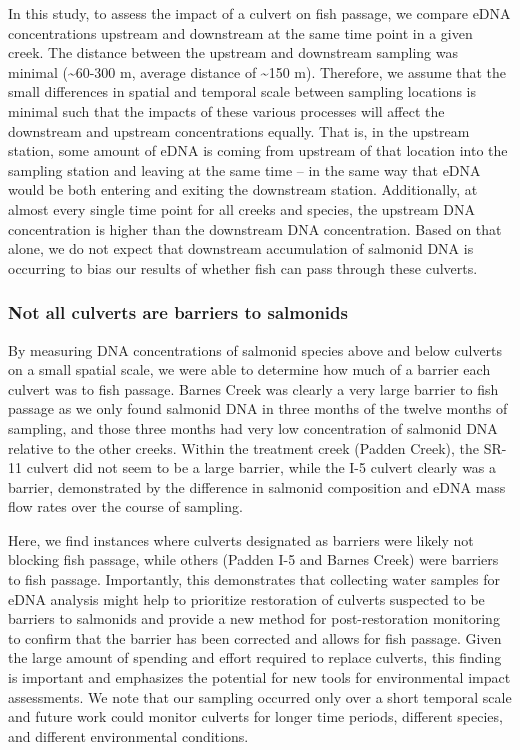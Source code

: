 \documentclass[
]{article}
\begin{document}
In this study, to assess the impact of a culvert on fish passage, we
compare eDNA concentrations upstream and downstream at the same time
point in a given creek. The distance between the upstream and downstream
sampling was minimal (\textasciitilde60-300 m, average distance of
\textasciitilde150 m). Therefore, we assume that the small differences
in spatial and temporal scale between sampling locations is minimal such
that the impacts of these various processes will affect the downstream
and upstream concentrations equally. That is, in the upstream station,
some amount of eDNA is coming from upstream of that location into the
sampling station and leaving at the same time -- in the same way that
eDNA would be both entering and exiting the downstream station.
Additionally, at almost every single time point for all creeks and
species, the upstream DNA concentration is higher than the downstream
DNA concentration. Based on that alone, we do not expect that downstream
accumulation of salmonid DNA is occurring to bias our results of whether
fish can pass through these culverts.

\hypertarget{not-all-culverts-are-barriers-to-salmonids}{%
\subsubsection{Not all culverts are barriers to
salmonids}\label{not-all-culverts-are-barriers-to-salmonids}}

By measuring DNA concentrations of salmonid species above and below
culverts on a small spatial scale, we were able to determine how much of
a barrier each culvert was to fish passage. Barnes Creek was clearly a
very large barrier to fish passage as we only found salmonid DNA in
three months of the twelve months of sampling, and those three months
had very low concentration of salmonid DNA relative to the other creeks.
Within the treatment creek (Padden Creek), the SR-11 culvert did not
seem to be a large barrier, while the I-5 culvert clearly was a barrier,
demonstrated by the difference in salmonid composition and eDNA mass
flow rates over the course of sampling.

Here, we find instances where culverts designated as barriers were
likely not blocking fish passage, while others (Padden I-5 and Barnes
Creek) were barriers to fish passage. Importantly, this demonstrates
that collecting water samples for eDNA analysis might help to prioritize
restoration of culverts suspected to be barriers to salmonids and
provide a new method for post-restoration monitoring to confirm that the
barrier has been corrected and allows for fish passage. Given the large
amount of spending and effort required to replace culverts, this finding
is important and emphasizes the potential for new tools for
environmental impact assessments. We note that our sampling occurred
only over a short temporal scale and future work could monitor culverts
for longer time periods, different species, and different environmental
conditions.
\end{document}
